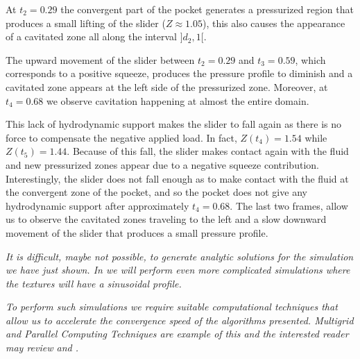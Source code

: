 At $t_2=0.29$ the convergent part of the pocket generates a pressurized region that produces a small lifting of the slider ($Z\approx 1.05$), this also causes the appearance of a cavitated zone all along the interval $]d_2,1[$.

The upward movement of the slider between $t_2=0.29$ and $t_3=0.59$, which corresponds to a positive squeeze, produces the pressure profile to diminish and a cavitated zone appears at the left side of the pressurized zone. Moreover, at $t_4=0.68$ we observe cavitation happening at almost the entire domain.

This lack of hydrodynamic support makes the slider to fall again as there is no force to compensate the negative applied load. In fact, $Z(t_4)=1.54$ while $Z(t_5)=1.44$. Because of this fall, the slider makes contact again with the fluid and new pressurized zones appear due to a negative squeeze contribution. Interestingly, the slider does not fall enough as to make contact with the fluid at the convergent zone of the pocket, and so the pocket does not give any hydrodynamic support after approximately $t_4=0.68$. The last two frames, allow us to observe the cavitated zones traveling to the left and a slow downward movement of the slider that produces a small pressure profile. 

\begin{remark}\it 
It is difficult, maybe not possible, to generate analytic solutions for the simulation we have just shown. In  we will perform even more complicated simulations where the textures will have a sinusoidal profile.
\end{remark}
\begin{remark}\it 
To perform such simulations we require suitable computational techniques that allow us to accelerate the convergence speed of the algorithms presented. Multigrid and Parallel Computing Techniques are example of this and the interested reader may review \cite{checophd} and \cite{checo2014arg}.
\end{remark}

